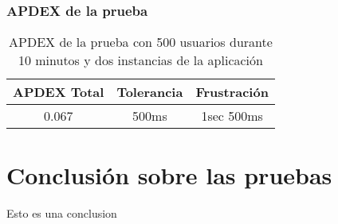 \subsubsection{APDEX de la prueba}
\begin{table}[!htbp]
    \centering
    \makegapedcells
    \begin{tabular}{|c|c|c}
    \hline
    APDEX Total & Tolerancia & Frustración\\ \hline
    0.067 & 500ms & 1sec 500ms \\ \hline
    \end{tabular}
    \caption{APDEX de la prueba con 500 usuarios durante 10 minutos y dos instancias de la aplicación}
    \label{tab:tabla_planes}
\end{table}
\break
\section{Conclusión sobre las pruebas}

Esto es una conclusion

